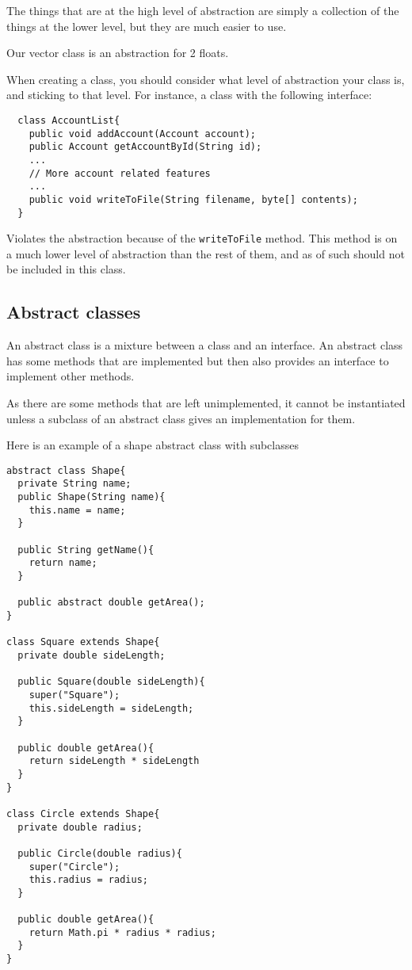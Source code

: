 \documentclass{article}
\begin{document}
  The things that are at the high level of abstraction are simply a collection
  of the things at the lower level, but they are much easier to use.

  Our vector class is an abstraction for 2 floats.

  When creating a class, you should consider what level of abstraction your
  class is, and sticking to that level. For instance, a class with the following
  interface:

  \begin{verbatim}
  class AccountList{
    public void addAccount(Account account);
    public Account getAccountById(String id);
    ...
    // More account related features
    ...
    public void writeToFile(String filename, byte[] contents);
  }
  \end{verbatim}
  
  Violates the abstraction because of the \texttt{writeToFile} method. This method is
  on a much lower level of abstraction than the rest of them, and as of such
  should not be included in this class.

  \subsection*{Abstract classes}
  An abstract class is a mixture between a class and an interface. An abstract
  class has some methods that are implemented but then also provides an interface
  to implement other methods.

  As there are some methods that are left unimplemented, it cannot be instantiated
  unless a subclass of an abstract class gives an implementation for them.

  Here is an example of a shape abstract class with subclasses
  
  \begin{verbatim}
abstract class Shape{
  private String name;
  public Shape(String name){
    this.name = name;
  }

  public String getName(){
    return name;
  }

  public abstract double getArea();
}

class Square extends Shape{
  private double sideLength;

  public Square(double sideLength){
    super("Square");
    this.sideLength = sideLength;
  }

  public double getArea(){
    return sideLength * sideLength
  }
}

class Circle extends Shape{
  private double radius;

  public Circle(double radius){
    super("Circle");
    this.radius = radius;
  }

  public double getArea(){
    return Math.pi * radius * radius;
  }
}
  \end{verbatim}
\end{document}
